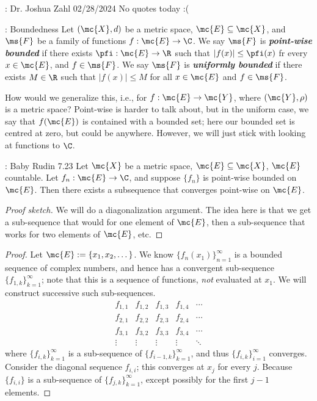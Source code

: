 \begin{nquote}{: Dr. Joshua Zahl 02/28/2024}
	No quotes today :(
\end{nquote}

\begin{ndef}{: Boundedness}
	Let \((\mc{X},d)\) be a metric space, \(\mc{E}\subseteq\mc{X}\), and \(\ms{F}\) be a family of functions \(f:\mc{E}\to\C\). We say \(\ms{F}\) is \emph{\textbf{point-wise bounded}} if there exists \(\pfi:\mc{E}\to\R\) such that \(|f(x)|\leq \pfi(x)\) fr every \(x\in\mc{E}\), and \(f\in\ms{F}\). We say \(\ms{F}\) is \emph{\textbf{uniformly bounded}} if there exists \(M\in\R\) such that \(|f(x)|\leq M\) for all \(x\in\mc{E}\) and \(f\in\ms{F}\).
\end{ndef}
How would we generalize this, i.e., for \(f:\mc{E}\to\mc{Y}\), where \((\mc{Y},\rho)\) is a metric space? Point-wise is harder to talk about, but in the uniform case, we say that \(f(\mc{E})\) is contained with a bounded set; here our bounded set is centred at zero, but could be anywhere. However, we will just stick with looking at functions to \(\C\).

\begin{ntheorem}{: Baby Rudin 7.23}
	Let \(\mc{X}\) be a metric space, \(\mc{E}\subseteq\mc{X}\), \(\mc{E}\) countable. Let \(f_n:\mc{E}\to\C\), and suppose \(\{f_n\}\) is point-wise bounded on \(\mc{E}\). Then there exists a subsequence that converges point-wise on \(\mc{E}\).
\end{ntheorem}
\begin{proof}[Proof sketch]
	We will do a diagonalization argument. The idea here is that we get a sub-sequence that would for one element of \(\mc{E}\), then a sub-sequence that works for two elements of \(\mc{E}\), etc.
\end{proof}
\begin{proof}
	Let \(\mc{E}:=\{x_1,x_2,\dots\}\). We know \(\{f_n(x_1)\}_{n=1}^{\infty}\) is a bounded sequence of complex numbers, and hence has a convergent sub-sequence \(\{f_{1,k}\}_{k=1}^{\infty}\); note that this is a sequence of functions, \emph{not} evaluated at \(x_1\). We will construct successive such sub-sequences.
	\begin{equation*}
		\begin{matrix}
			f_{1,1} & f_{1,2} & f_{1,3} & f_{1,4} & \cdots\\
			f_{2,1} & f_{2,2} & f_{2,3} & f_{2,4} & \cdots\\
			f_{3,1} & f_{3,2} & f_{3,3} & f_{3,4} & \cdots\\
			\vdots & \vdots & \vdots & \vdots & \ddots
		\end{matrix}
	\end{equation*}
	where \(\{f_{i,k}\}_{k=1}^{\infty}\) is a sub-sequence of \(\{f_{i-1,k}\}_{k=1}^{\infty}\), and thus \(\{f_{i,k}\}_{i=1}^{\infty}\) converges. Consider the diagonal sequence \(f_{i,i}\); this converges at \(x_j\) for every \(j\). Because \(\{f_{i,i}\}\) is a sub-sequence of \(\{f_{j,k}\}_{k=1}^{\infty}\), except possibly for the first \(j-1\) elements.
\end{proof}

